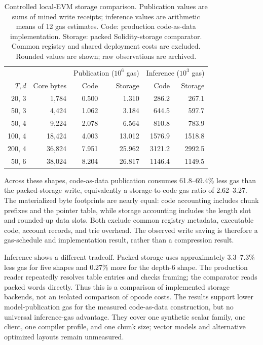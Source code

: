 \documentclass{ledger}
\begin{document}
\begin{table}[htbp]
\centering
\small
\caption{Controlled local-EVM storage comparison. Publication values are sums
of mined write receipts; inference values are arithmetic means of 12 gas
estimates. Code: production code-as-data implementation. Storage: packed
Solidity-storage comparator. Common registry and shared deployment costs are
excluded. Rounded values are shown; raw observations are archived.}
\label{tab:storagecomparison}
\setlength{\tabcolsep}{4pt}
\begin{tabular}{@{}rrrrrr@{}}
\toprule
 & & \multicolumn{2}{c}{Publication ($10^6$ gas)} & \multicolumn{2}{c}{Inference ($10^3$ gas)}\\
$T,d$ & Core bytes & Code & Storage & Code & Storage\\
\midrule
20, 3 & 1,784 & 0.500 & 1.310 & 286.2 & 267.1\\
50, 3 & 4,424 & 1.062 & 3.184 & 644.5 & 597.7\\
50, 4 & 9,224 & 2.078 & 6.564 & 810.8 & 783.9\\
100, 4 & 18,424 & 4.003 & 13.012 & 1576.9 & 1518.8\\
200, 4 & 36,824 & 7.951 & 25.962 & 3121.2 & 2992.5\\
50, 6 & 38,024 & 8.204 & 26.817 & 1146.4 & 1149.5\\
\bottomrule
\end{tabular}
\end{table}

Across these shapes, code-as-data publication consumes 61.8--69.4\% less gas
than the packed-storage write, equivalently a storage-to-code gas ratio of
2.62--3.27. The materialized byte footprints are nearly equal: code accounting
includes chunk prefixes and the pointer table, while storage accounting
includes the length slot and rounded-up data slots. Both exclude common
registry metadata, executable code, account records, and trie overhead.
The observed write saving is therefore a gas-schedule and implementation
result, rather than a compression result.

Inference shows a different tradeoff. Packed storage uses approximately
3.3--7.3\% less gas for five shapes and 0.27\% more for the depth-6 shape.
The production reader repeatedly resolves table entries and checks framing;
the comparator reads packed words directly. Thus this is a comparison of
implemented storage backends, not an isolated comparison of opcode costs.
The results support lower model-publication gas for the measured code-as-data
construction, but no universal inference-gas advantage. They cover one
synthetic scalar family, one client, one compiler profile, and one chunk
size; vector models and alternative optimized layouts remain unmeasured.
\end{document}
